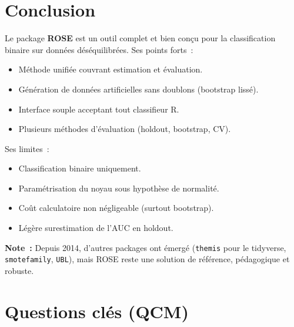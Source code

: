 \documentclass[a4paper,11pt]{article}
\theoremstyle{definition}
\begin{document}
\section{Conclusion}

Le package \textbf{ROSE} est un outil complet et bien con\c cu pour
la classification binaire sur donn\'ees d\'es\'equilibr\'ees. Ses
points forts~:
\begin{itemize}
  \item M\'ethode unifi\'ee couvrant estimation et \'evaluation.
  \item G\'en\'eration de donn\'ees artificielles sans doublons
    (bootstrap liss\'e).
  \item Interface souple acceptant tout classifieur R.
  \item Plusieurs m\'ethodes d'\'evaluation (holdout, bootstrap, CV).
\end{itemize}

Ses limites~:
\begin{itemize}
  \item Classification binaire uniquement.
  \item Param\'etrisation du noyau sous hypoth\`ese de normalit\'e.
  \item Co\^ut calculatoire non n\'egligeable (surtout bootstrap).
  \item L\'eg\`ere surestimation de l'AUC en holdout.
\end{itemize}

\textbf{Note~:} Depuis 2014, d'autres packages ont \'emerg\'e
(\texttt{themis} pour le tidyverse, \texttt{smotefamily},
\texttt{UBL}), mais ROSE reste une solution de r\'ef\'erence,
p\'edagogique et robuste.

\newpage
\section*{Questions cl\'es (QCM)}
\end{document}
